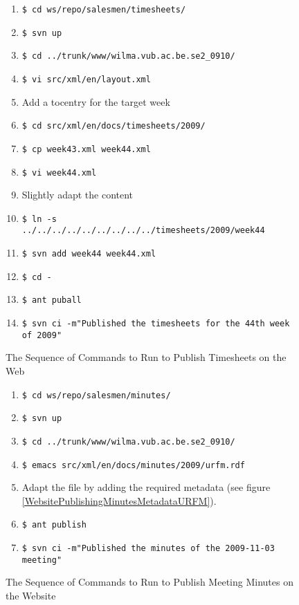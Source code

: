 \begin{figure}[th]
\caption{The Sequence of Commands to Run to Publish Timesheets
on the Web}
\label{WebsitePublishingTimesheetsCommands}
\begin{enumerate}
\item \verb*#$ cd ws/repo/salesmen/timesheets/#
\item \verb*#$ svn up#
\item \verb*#$ cd ../trunk/www/wilma.vub.ac.be.se2_0910/#
\item \verb*#$ vi src/xml/en/layout.xml#
\item Add a tocentry for the target week
\item \verb*#$ cd src/xml/en/docs/timesheets/2009/#
\item \verb*#$ cp week43.xml week44.xml#
\item \verb*#$ vi week44.xml #
\item Slightly adapt the content
\item \verb*#$ ln -s ../../../../../../../../../timesheets/2009/week44#
\item \verb*#$ svn add week44 week44.xml#
\item \verb*#$ cd -#
\item \verb*#$ ant puball#
\item \verb*#$ svn ci -m"Published the timesheets for the 44th week of 2009"#
\end{enumerate}
\end{figure}

\begin{figure}[hb]
\caption{The Sequence of Commands to Run to Publish Meeting Minutes on the Website}
\label{WebsitePublishingMinutesCommands}
\begin{enumerate}
\item \verb*#$ cd ws/repo/salesmen/minutes/#
\item \verb*#$ svn up#
\item \verb*#$ cd ../trunk/www/wilma.vub.ac.be.se2_0910/#
\item \verb*#$ emacs src/xml/en/docs/minutes/2009/urfm.rdf#
\item Adapt the file by adding the required metadata (see figure \ref{WebsitePublishingMinutesMetadataURFM}).
\item \verb*#$ ant publish#
\item \verb*#$ svn ci -m"Published the minutes of the 2009-11-03 meeting"#
\end{enumerate}
\end{figure}

